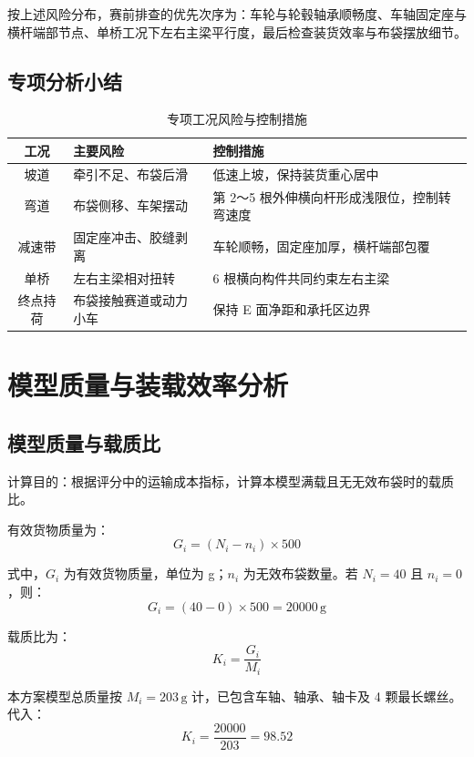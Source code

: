 \documentclass[UTF8,a4paper,12pt,fontset=none]{ctexart}
\numberwithin{equation}{section}
\numberwithin{figure}{section}
\numberwithin{table}{section}
\newcommand{\g}{\,\mathrm{g}}
\begin{document}
按上述风险分布，赛前排查的优先次序为：车轮与轮毂轴承顺畅度、车轴固定座与横杆端部节点、单桥工况下左右主梁平行度，最后检查装货效率与布袋摆放细节。

\subsection{专项分析小结}
\begin{table}[H]
\centering
\caption{专项工况风险与控制措施}
\label{tab:case-summary}
\begin{tabularx}{\linewidth}{cY Y}
\toprule
\textbf{工况} & \textbf{主要风险} & \textbf{控制措施} \\\midrule
坡道 & 牵引不足、布袋后滑 & 低速上坡，保持装货重心居中 \\
弯道 & 布袋侧移、车架摆动 & 第 2～5 根外伸横向杆形成浅限位，控制转弯速度 \\
减速带 & 固定座冲击、胶缝剥离 & 车轮顺畅，固定座加厚，横杆端部包覆 \\
单桥 & 左右主梁相对扭转 & 6 根横向构件共同约束左右主梁 \\
终点持荷 & 布袋接触赛道或动力小车 & 保持 E 面净距和承托区边界 \\
\bottomrule
\end{tabularx}
\end{table}

\newpage
\section{模型质量与装载效率分析}

\subsection{模型质量与载质比}
计算目的：根据评分中的运输成本指标，计算本模型满载且无无效布袋时的载质比。

有效货物质量为：
\begin{equation}
  G_i=(N_i-n_i)\times500
\end{equation}

式中，$G_i$ 为有效货物质量，单位为 g；$n_i$ 为无效布袋数量。若 $N_i=40$ 且 $n_i=0$，则：
\begin{equation}
  G_i=(40-0)\times500=20000\g
\end{equation}

载质比为：
\begin{equation}
  K_i=\frac{G_i}{M_i}
\end{equation}

本方案模型总质量按 $M_i=203\g$ 计，已包含车轴、轴承、轴卡及 4 颗最长螺丝。代入：
\begin{equation}
  K_i=\frac{20000}{203}=98.52
\end{equation}
\end{document}
